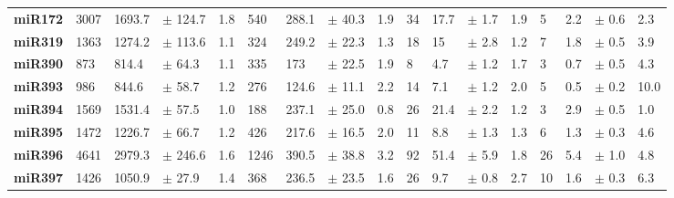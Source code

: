 \begin{landscape}
\begin{table}[]
\begin{tabular}{lllllllllllllllll}
\textbf{miR172}      & 3007           & 1693.7            & $\pm$  124.7     & 1.8            & 540            & 288.1             & $\pm$  40.3      & 1.9            & 34             & 17.7              & $\pm$  1.7       & 1.9            & 5              & 2.2               & $\pm$  0.6       & 2.3            \\
\textbf{miR319}      & 1363           & 1274.2            & $\pm$  113.6     & 1.1            & 324            & 249.2             & $\pm$  22.3      & 1.3            & 18             & 15                & $\pm$  2.8       & 1.2            & 7              & 1.8               & $\pm$  0.5       & 3.9            \\
\textbf{miR390}      & 873            & 814.4             & $\pm$  64.3      & 1.1            & 335            & 173               & $\pm$  22.5      & 1.9            & 8              & 4.7               & $\pm$  1.2       & 1.7            & 3              & 0.7               & $\pm$  0.5       & 4.3            \\
\textbf{miR393}      & 986            & 844.6             & $\pm$  58.7      & 1.2            & 276            & 124.6             & $\pm$  11.1      & 2.2            & 14             & 7.1               & $\pm$  1.2       & 2.0            & 5              & 0.5               & $\pm$  0.2       & 10.0           \\
\textbf{miR394}      & 1569           & 1531.4            & $\pm$  57.5      & 1.0            & 188            & 237.1             & $\pm$  25.0      & 0.8            & 26             & 21.4              & $\pm$  2.2       & 1.2            & 3              & 2.9               & $\pm$  0.5       & 1.0            \\
\textbf{miR395}      & 1472           & 1226.7            & $\pm$  66.7      & 1.2            & 426            & 217.6             & $\pm$  16.5      & 2.0            & 11             & 8.8               & $\pm$  1.3       & 1.3            & 6              & 1.3               & $\pm$  0.3       & 4.6            \\
\textbf{miR396}      & 4641           & 2979.3            & $\pm$  246.6     & 1.6            & 1246           & 390.5             & $\pm$  38.8      & 3.2            & 92             & 51.4              & $\pm$  5.9       & 1.8            & 26             & 5.4               & $\pm$  1.0       & 4.8            \\
\textbf{miR397}      & 1426           & 1050.9            & $\pm$  27.9      & 1.4            & 368            & 236.5             & $\pm$  23.5      & 1.6            & 26             & 9.7               & $\pm$  0.8       & 2.7            & 10             & 1.6               & $\pm$  0.3       & 6.3            \\

\end{tabular}
\end{table}
\end{landscape}
